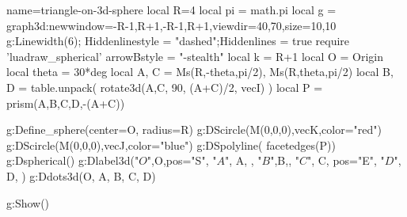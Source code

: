 \documentclass[12pt]{standalone}
\begin{document}
\begin{luadraw}{name=triangle-on-3d-sphere}
local R=4
local pi = math.pi
local g = graph3d:new{window={-R-1,R+1,-R-1,R+1},viewdir={40,70},size={10,10}}
g:Linewidth(6); Hiddenlinestyle = "dashed";Hiddenlines = true
require 'luadraw_spherical'
arrowBstyle = "-stealth"
local k = R+1
local O = Origin
local theta = 30*deg
local A, C = Ms(R,-theta,pi/2), Ms(R,theta,pi/2)
local B, D = table.unpack( rotate3d({A,C}, 90, {(A+C)/2, vecI}) )
local P = prism({A,B,C,D},-(A+C))

g:Define_sphere({center=O, radius=R}) 
g:DScircle({M(0,0,0),vecK},{color="red"}) 
g:DScircle({M(0,0,0),vecJ},{color="blue"}) 
g:DSpolyline( facetedges(P))
g:Dspherical()
g:Dlabel3d("$O$",O,{pos="S"}, "$A$", A, {}, "$B$",B,{}, "$C$", C, {pos="E"}, "$D$", D, {})
g:Ddots3d({O, A, B, C, D})

g:Show()
\end{luadraw} 
\end{document}
